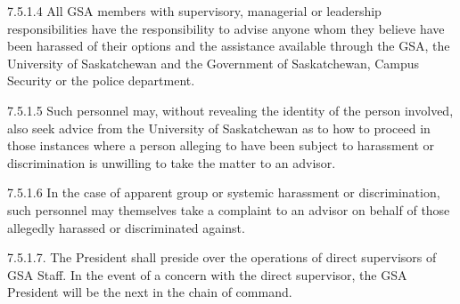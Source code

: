  
 
 7.5.1.4 All GSA members with supervisory, managerial or leadership 
 responsibilities have the responsibility to advise anyone whom they 
 believe have been harassed of their options and the assistance 
 available through the GSA, the University of Saskatchewan and the 
 Government of Saskatchewan, Campus Security or the police 
 department. 
 
 7.5.1.5 Such personnel may, without revealing the identity of the person 
 involved, also seek advice from the University of Saskatchewan as to 
 how to proceed in those instances where a person alleging to have 
 been subject to harassment or discrimination is unwilling to take the 
 matter to an advisor. 
 
 
 
 7.5.1.6 In the case of apparent group or systemic harassment or 
 discrimination, such personnel may themselves take a complaint to an 
 advisor on behalf of those allegedly harassed or discriminated against. 
 
 7.5.1.7. The President shall preside over the operations of direct supervisors 
 of GSA Staff. In the event of a concern with the direct supervisor, the 
 GSA President will be the next in the chain of command. 